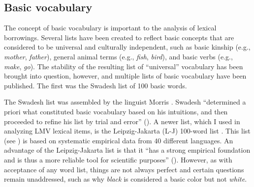 \documentclass[output=paper]{LSP/langsci}
\begin{document}
\subsection{Basic vocabulary}

	The concept of basic vocabulary is important to the analysis of lexical borrowings. Several lists have been created to reflect basic concepts that are considered to be universal and culturally independent, such as basic kinship (e.g., \emph{mother}, \emph{father}), general animal terms (e.g., \emph{fish}, \emph{bird}), and basic verbs (e.g., \emph{make}, \emph{go}). The stability of the resulting list of “universal” vocabulary has been brought into question, however, and multiple lists of basic vocabulary have been published. The first was the Swadesh list of 100 basic words.

	The Swadesh list was assembled by the linguist Morris \citet{Swadesh1971}. Swadesh “determined a priori what constituted basic vocabulary based on his intuitions, and then proceeded to refine his list by trial and error” (\citealt[230]{Tadmoretal2010}). A newer list, which I used in analyzing LMV lexical items, is the Leipzig-Jakarta (L-J) 100-word list \citet{HaspelmathTadmor2009}. This list (see ) is based on systematic empirical data from 40 different languages. An advantage of the Leipzig-Jakarta list is that it ``has a strong empirical foundation and is thus a more reliable tool for scientific purposes” (\citealt[230]{Tadmoretal2010}). However, as with acceptance of any word list, things are not always perfect and certain questions remain unaddressed, such as why \emph{black} is considered a basic color but not \emph{white}.
\end{document}
